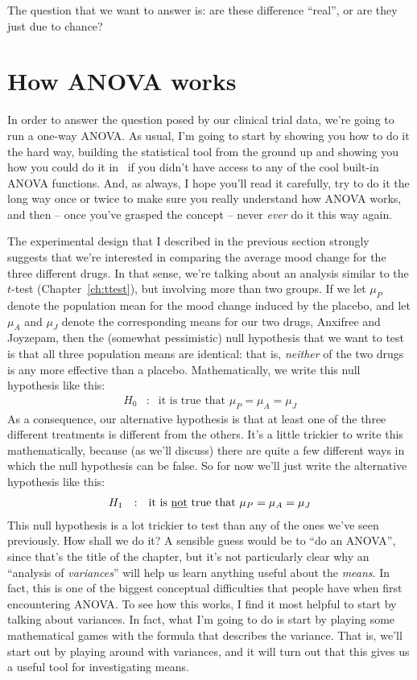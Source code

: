 The question that we want to answer is: are these difference ``real'', or are they just due to chance?



\section{How ANOVA works \label{sec:anovaintro}}

In order to answer the question posed by our clinical trial data, we're going to run a one-way ANOVA. As usual, I'm going to start by showing you how to do it the hard way, building the statistical tool from the ground up and showing you how you could do it in \R\ if you didn't have access to any of the cool built-in ANOVA functions. And, as always, I hope you'll read it carefully, try to do it the long way once or twice to make sure you really understand how ANOVA works, and then -- once you've grasped the concept -- never {\it ever} do it this way again.

The experimental design that I described in the previous section strongly suggests that we're interested in comparing the average mood change for the three different drugs. In that sense, we're talking about an analysis similar to the $t$-test (Chapter~\ref{ch:ttest}), but involving more than two groups. If we let $\mu_P$ denote the population mean for the mood change induced by the placebo, and let $\mu_A$ and $\mu_J$ denote the corresponding means for our two drugs, Anxifree and Joyzepam, then the (somewhat pessimistic) null hypothesis that we want to test is that all three population means are identical: that is, {\it neither} of the two drugs is any more effective than a placebo. Mathematically, we write this null hypothesis like this:
$$
\begin{array}{rcl}
H_0 &:& \mbox{it is true that } \mu_P = \mu_A = \mu_J
\end{array}
$$
As a consequence, our alternative hypothesis is that at least one of the three different treatments is different from the others. It's a little trickier to write this mathematically, because (as we'll discuss) there are quite a few different ways in which the null hypothesis can be false. So for now we'll just write the alternative hypothesis like this:
$$
\begin{array}{rcl}
H_1 &:& \mbox{it is \underline{not} true that } \mu_P = \mu_A = \mu_J
\end{array}
$$
This null hypothesis is a lot trickier to test than any of the ones we've seen previously. How shall we do it? A sensible guess would be to ``do an ANOVA'', since that's the title of the chapter, but it's not particularly clear why an ``analysis of {\it variances}'' will help us learn anything useful about the {\it means}. In fact, this is one of the biggest conceptual difficulties that people have when first encountering ANOVA. To see how this works, I find it most helpful to start by talking about variances. In fact, what I'm going to do is start by playing some mathematical games with the formula that describes the variance. That is, we'll start out by playing around with variances, and it will turn out that this gives us a useful tool for investigating means.


